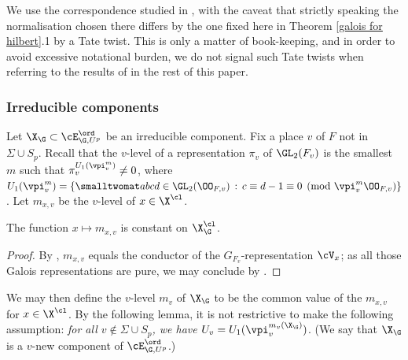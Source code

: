 We use the correspondence studied in \cite{LLC}, with the caveat that  strictly speaking  the normalisation chosen there differs by the one fixed here in Theorem \ref{galois for hilbert}.1 by a Tate twist. This is only a matter of book-keeping, and in order to avoid excessive notational burden, we do not signal such Tate twists when referring to the results of \cite{LLC} in the rest of this paper.





\subsubsection{Irreducible components}
Let $\X_{\G}\subset \cE^{\ord}_{\G, U^{p}}$ be an irreducible component.  Fix a place $v$ of $F$ not in $\Sigma\cup S_{p}$.
 Recall that the $v$-level of a representation $\pi_{v}$ of $\GL_{2}(F_{v})$ is the smallest $m$ such that $\pi_{v}^{U_{1}(\vpi_{v}^{m})}\neq 0$, where $U_{1}(\vpi_{v}^{m})= \{\smalltwomat abcd \in \GL_{2}(\OO_{F,v})\, :\, c\equiv d-1\equiv 0 \pmod{\vpi_{v}^{m}\OO_{F,v}}\}$.  Let $m_{x,v}$ be the $v$-level of $x\in\X^{\cl}$.
\begin{lemm} The function $x\mapsto m_{x,v}$ is constant on $\X_{\G}^{\cl}$.
\end{lemm}
\begin{proof}
By \cite{carayol-h}, $m_{x,v}$ equals the conductor of the $G_{F_{v}}$-representation $\cV_{x}$; as all those Galois representations are pure, we may conclude by  \cite[Theorem 3.4]{saha-cond}.
\end{proof}

 We may then define the $v$-level $m_{v}$ of $\X_{\G}$ to be the common value of the $m_{x,v}$ for $x\in \X^{\cl}$.  By the following lemma, it is not restrictive to make the following assumption: \emph{for all $v\notin \Sigma \cup S_{p}$, we have $U_{v}=U_{1}{(\vpi}_{v}^{m_{v}(\X_{\G})})$}. (We say that $\X_{\G}$ is a $v$-new component of $\cE_{\G, U^{p}}^{\ord}$.)


